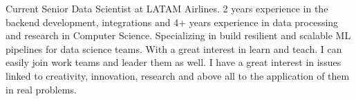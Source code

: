 

\begin{cvparagraph}

Current Senior Data Scientist at LATAM Airlines. 2 years experience in the backend development, integrations and 4+ years experience in data processing and research in Computer Science. 
Specializing in build resilient and scalable ML pipelines for data science teams. With a great interest in learn and teach. I can easily join work teams and leader them as well. I have a great interest in issues linked to creativity, innovation, research and above all to the application of them in real problems.
\end{cvparagraph}
